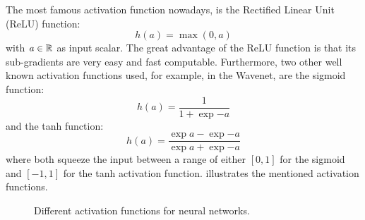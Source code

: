 The most famous activation function nowadays, is the Rectified Linear Unit (ReLU) \cite{Zeiler2013_relu} function:
\begin{equation}\label{eq:nn_theory_relu}
  h(a) = \max{(0, a)}
\end{equation}
with $a \in \mathbb{R}$ as input scalar.
The great advantage of the ReLU function is that its sub-gradients are very easy and fast computable.
Furthermore, two other well known activation functions used, for example, in the Wavenet, are the sigmoid function:
\begin{equation}\label{eq:nn_theory_sigmoid}
  h(a) = \frac{1}{1 + \exp{-a}}
\end{equation}
and the tanh function:
\begin{equation}\label{eq:nn_theory_tanh}
  h(a) = \frac{\exp{a} - \exp{-a}}{\exp{a} + \exp{-a}}
\end{equation}
where both squeeze the input between a range of either $[0, 1]$ for the sigmoid and $[-1, 1]$ for the tanh activation function.
 illustrates the mentioned activation functions.
\begin{figure}[!ht]
  \centering
    \quad
    \quad
  \caption{Different activation functions for neural networks.}
  \label{fig:nn_theory_activation}
\end{figure}
\FloatBarrier
\noindent


